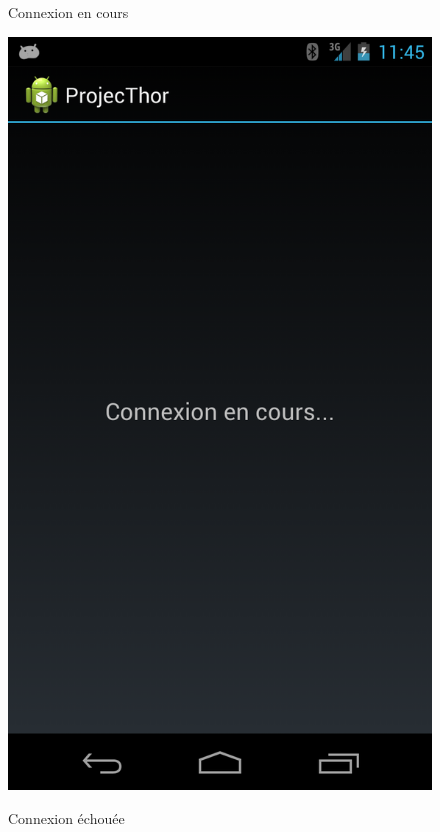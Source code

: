 \begin{figure}

	\begin{minipage}{0.45\textwidth}
		\caption{Connexion en cours}
		\label{view_0}
		\center
		\includegraphics[scale=0.2]{view_1.png}
	\end{minipage}
	\hspace{0.1\textwidth}
	\begin{minipage}{0.45\textwidth}
		\caption{Connexion échouée}
		\label{view_1}

\end{minipage}
\end{figure}
